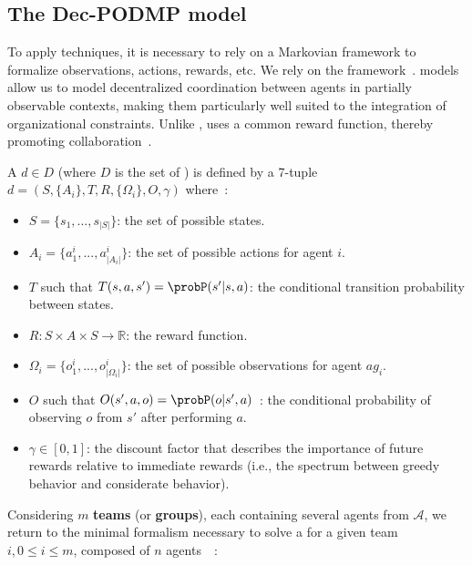 \subsection{The Dec-PODMP model}\label{sec:dec-podmp}

To apply  techniques, it is necessary to rely on a Markovian framework to formalize observations, actions, rewards, etc. We rely on the  framework~\cite{Oliehoek2016}.  models allow us to model decentralized coordination between agents in partially observable contexts, making them particularly well suited to the integration of organizational constraints. Unlike ,  uses a common reward function, thereby promoting collaboration~\cite{Beynier2013}.

A  $d \in D$ (where $D$ is the set of ) is defined by a 7-tuple $d = (S,\{A_i\},T,R,\{\Omega_i\},O,\gamma)$ where~:
\begin{itemize}
  \item $S = \{s_1, ..., s_{|S|}\}$: the set of possible states.
  \item $A_i = \{a_1^i, ..., a_{|A_i|}^i\}$: the set of possible actions for agent $i$.
  \item $T$ such that $T(s,a,s') = \probP(s'|s,a)$: the conditional transition probability between states.
  \item $R: S \times A \times S \rightarrow \mathbb{R}$: the reward function.
  \item $\Omega_i = \{o_1^i, ..., o_{|\Omega_i|}^i\}$: the set of possible observations for agent $ag_i$.
  \item $O$ such that $O(s',a,o) = \probP(o|s',a)$~: the conditional probability of observing $o$ from $s'$ after performing $a$.
  \item $\gamma \in [0,1]$: the discount factor that describes the importance of future rewards relative to immediate rewards (i.e., the spectrum between greedy behavior and considerate behavior).
\end{itemize}

Considering $m$ \textbf{teams} (or \textbf{groups}), each containing several agents from $\mathcal{A}$, we return to the minimal formalism necessary to solve a  for a given team $i, 0 \leq i \leq m$, composed of $n$ agents~\cite {Beynier2013,Albrecht2024}~:

